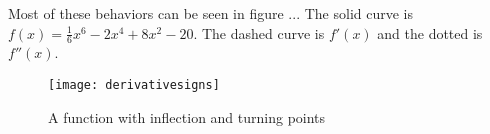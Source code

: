 Most of these behaviors can be seen in figure ...  The solid curve is $f(x)=\frac{1}{6}x^6
-2x^4+8x^2-20$.  The dashed curve is $f'(x)$ and the dotted is $f''(x)$.

\begin{figure}\label{derivativesigns}
\begin{centering}
\texttt{[image: derivativesigns]}
\caption{A function with inflection and turning points}
\end{centering}
\end{figure}

